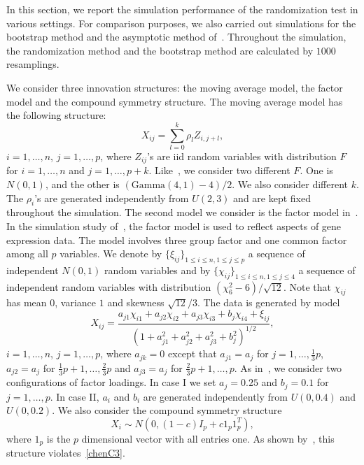 \documentclass[3p]{elsarticle}
\DeclareMathOperator{\mytr}{tr}
\theoremstyle{plain}
\theoremstyle{definition}
\theoremstyle{remark}
\begin{document}
In this section, we report the simulation performance of the randomization test in various settings.
For comparison purposes, we also carried out simulations for the bootstrap method and the asymptotic method of~\citet{Chen2010A}.
Throughout the simulation, the randomization method and the bootstrap method are calculated by $1000$ resamplings.

We consider three innovation structures: the moving average model, the factor model and the compound symmetry structure.
The moving average model has the following structure:
    \begin{equation*}
    X_{ij}=\sum_{l=0}^k \rho_{l}Z_{i,j+l},
    \end{equation*}
$i=1,\ldots, n$, $j=1,\ldots, p$, where $Z_{ij}$'s are iid random variables with distribution $F$ for $i=1,\ldots, n$ and $j=1,\ldots, p+k$. 
Like~\citet{Chen2010A}, we consider two different $F$.
One is $N(0,1)$, and the other is $(\textrm{Gamma}(4,1)-4)/2$.
We also consider different $k$.
The $\rho_i$'s are generated independently from $U(2,3)$ and are kept fixed throughout the simulation.
The second model we consider is the factor model in~\citet{fan2007to}.
In the simulation study of~\citet{fan2007to}, the factor model is used to reflect aspects of gene expression data.
The model involves three group factor and one common factor among all $p$ variables. 
We denote by $\{\xi_{ij}\}_{1\leq i\leq n, 1\leq j\leq p}$ a sequence of independent $N(0,1)$ random variables and by $\{\chi_{ij}\}_{1\leq i \leq n, 1\leq j \leq 4}$ a sequence of independent random variables with distribution $(\chi_{6}^2-6)/\sqrt{12}$.
Note that $\chi_{ij}$ has mean $0$, variance $1$ and skewness $\sqrt{12}/3$.
The data is generated by model
\begin{equation*}
    X_{ij}=\frac{a_{j1}\chi_{i1}+a_{j2}\chi_{i2}+a_{j3}\chi_{i3}+b_{j}\chi_{i4}+\xi_{ij}}{{(1+a_{j1}^2+a_{j2}^2+a_{j3}^2+b_j^2)}^{1/2}},
\end{equation*}
$i=1,\ldots, n$, $j=1,\ldots, p$,
where $a_{jk}=0$ except that $a_{j1}=a_j$ for $j=1,\ldots,\frac{1}{3}p$, $a_{j2}=a_j$ for $\frac{1}{3}p+1,\ldots,\frac{2}{3}p$ and $a_{j3}=a_j$ for $\frac{2}{3}p+1,\ldots,p$.
As in~\citet{fan2007to}, we consider two configurations of factor loadings. In  case I we set $a_j=0.25$ and $b_j=0.1$ for $j=1,\ldots, p$. In case II, $a_i$ and $b_i$ are generated independently from $U(0,0.4)$ and $U(0,0.2)$.
We also consider the compound symmetry structure
$$X_i\sim N(0,(1-c)I_p+c 1_{p}1_{p}^T),$$
where $1_{p}$ is the $p$ dimensional vector with all entries one.
As shown by~\cite{KATAYAMA2013410}, this structure violates~\eqref{chenC3}.
\end{document}
